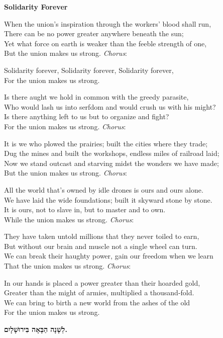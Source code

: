 \begin{english}
\begin{center}
{\bfseries \large \textcolor{light-gray}{Solidarity Forever}}
\end{center}

When the union's inspiration through the workers' blood shall run, \\
There can be no power greater anywhere beneath the sun; \\
Yet what force on earth is weaker than the feeble strength of one, \\
But the union makes us strong. {\itshape Chorus}:

\begin{center}
Solidarity forever,
Solidarity forever,
Solidarity forever, \\
For the union makes us strong.
\end{center}

Is there aught we hold in common with the greedy parasite, \\
Who would lash us into serfdom and would crush us with his might? \\
Is there anything left to us but to organize and fight? \\
For the union makes us strong. {\itshape Chorus}: \vspace{1em}

It is we who plowed the prairies; built the cities where they trade; \\
Dug the mines and built the workshops, endless miles of railroad laid; \\
Now we stand outcast and starving midst the wonders we have made; \\
But the union makes us strong. {\itshape Chorus}: \vspace{1em}

All the world that's owned by idle drones is ours and ours alone. \\
We have laid the wide foundations; built it skyward stone by stone. \\
It is ours, not to slave in, but to master and to own. \\
While the union makes us strong. {\itshape Chorus}: \vspace{1em}

They have taken untold millions that they never toiled to earn, \\
But without our brain and muscle not a single wheel can turn. \\
We can break their haughty power, gain our freedom when we learn \\
That the union makes us strong. {\itshape Chorus}: \vspace{1em}

In our hands is placed a power greater than their hoarded gold, \\
Greater than the might of armies, multiplied a thousand-fold. \\
We can bring to birth a new world from the ashes of the old \\
For the union makes us strong.
\end{english}

\vspace{2em}

{\Huge \bfseries
 לְשָׁנָה הַבָּאָה בִּירוּשָׁלָיִם.
}